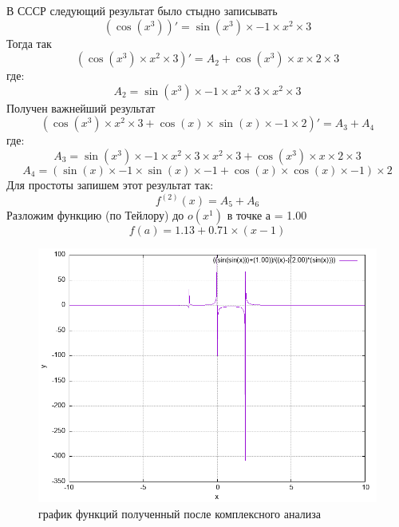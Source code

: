 \documentclass{article}
\begin{document}
В СССР следующий результат было стыдно записывать\newline
\[(\cos( x ^{ 3 }))' = \sin( x ^{ 3 })\times -1 \times x ^{ 2 }\times 3 \]\newline
Тогда так\newline
\[(\cos( x ^{ 3 })\times x ^{ 2 }\times 3 )' =  A_{2} +\cos( x ^{ 3 })\times x \times 2 \times 3 \]\newline
где:\[A_{2} = \sin( x ^{ 3 })\times -1 \times x ^{ 2 }\times 3 \times x ^{ 2 }\times 3 \]\newline
Получен важнейший результат\newline
\[(\cos( x ^{ 3 })\times x ^{ 2 }\times 3 +\cos( x )\times\sin( x )\times -1 \times 2 )' =  A_{3} + A_{4} \]\newline
где:\[A_{3} = \sin( x ^{ 3 })\times -1 \times x ^{ 2 }\times 3 \times x ^{ 2 }\times 3 +\cos( x ^{ 3 })\times x \times 2 \times 3 \]\newline
\[A_{4} = (\sin( x )\times -1 \times\sin( x )\times -1 +\cos( x )\times\cos( x )\times -1 )\times 2 \]\newline
Для простоты запишем этот результат так:\newline
\[f^{(2)}(x) =  A_{5} + A_{6} \]\newline
Разложим функцию (по Тейлору) до $o(x^{1})$ в точке а = 1.00\newline
\[f(a) =  1.13 + 0.71 \times( x - 1 )\]\newlinne
\begin{figure}[h]
\centering
\includegraphics[width=0.8\linewidth]{func.png}
\caption{график функций полученный после комплексного анализа}
\label{fig:mpr}
\end{figure}
\end{document}
